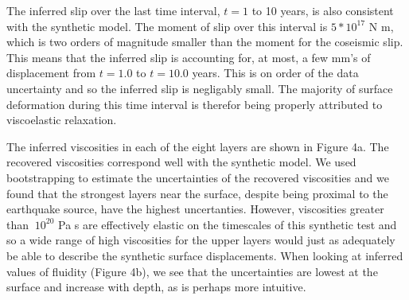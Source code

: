 \documentclass[extra,mreferee]{gji}
\begin{document}
The inferred slip over the last time interval, $t=1$ to 10 years, is
also consistent with the synthetic model.  The moment of slip
over this interval is $5*10^{17}$ N m, which is two orders of
magnitude smaller than the moment for the coseismic slip.  This means
that the inferred slip is accounting for, at most, a few mm's of
displacement from $t=1.0$ to $t=10.0$ years.  This is on order of the
data uncertainty and so the inferred slip is negligably small.  The
majority of surface deformation during this time interval is therefor being
properly attributed to viscoelastic relaxation.

The inferred viscosities in each of the eight layers are shown in
Figure 4a.  The recovered viscosities correspond well with the
synthetic model.  We used bootstrapping to estimate the uncertainties
of the recovered viscosities and we found that the strongest layers
near the surface, despite being proximal to the earthquake source,
have the highest uncertanties.  However, viscosities greater than
$~10^{20}$ Pa s are effectively elastic on the timescales of this
synthetic test and so a wide range of high viscosities for the upper
layers would just as adequately be able to describe the synthetic
surface displacements.  When looking at inferred values of fluidity
(Figure 4b), we see that the uncertainties are lowest at the surface
and increase with depth, as is perhaps more intuitive.

\end{document}

